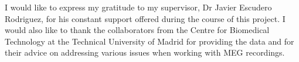 \begin{acknowledgements}

I would like to express my gratitude to my supervisor, Dr Javier Escudero Rodriguez, for his constant support offered during the course of this project. I would also like to thank the collaborators from the Centre for Biomedical Technology at the Technical University of Madrid for providing the data and for their advice on addressing various issues when working with \ac{MEG} recordings.  

\end{acknowledgements}
